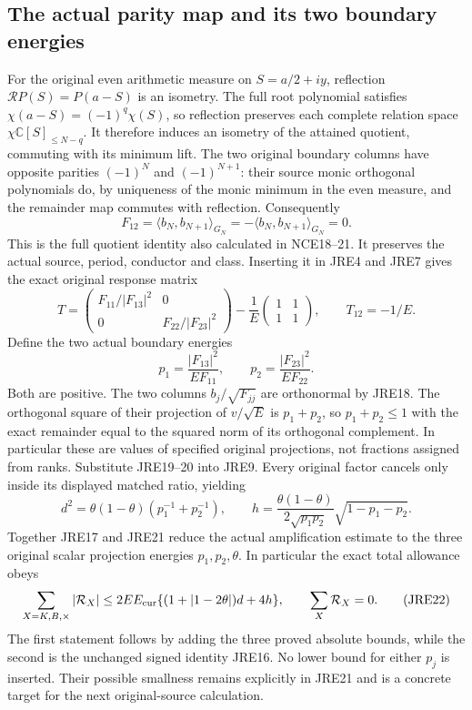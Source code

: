 \documentclass[11pt,a4paper]{article}
\begin{document}
\subsection{The actual parity map and its two boundary energies}
For the original even arithmetic measure on $S=a/2+iy$, reflection
$\mathcal R P(S)=P(a-S)$ is an isometry. The full root polynomial
satisfies $\chi(a-S)=(-1)^q\chi(S)$, so reflection preserves each
complete relation space $\chi\mathbb C[S]_{\le N-q}$. It therefore
induces an isometry of the attained quotient, commuting with its
minimum lift. The two original boundary columns have opposite
parities $(-1)^N$ and $(-1)^{N+1}$: their source monic orthogonal
polynomials do, by uniqueness of the monic minimum in the even
measure, and the remainder map commutes with reflection. Consequently
\[
 F_{12}=\langle b_N,b_{N+1}\rangle_{G_N}
       =-\langle b_N,b_{N+1}\rangle_{G_N}=0 .                   \tag{JRE18}
\]
This is the full quotient identity also calculated in NCE18--21.
It preserves the actual source, period, conductor and class. Inserting
it in JRE4 and JRE7 gives the exact original response matrix
\[
 T=\begin{pmatrix}F_{11}/|F_{13}|^2&0\\0&F_{22}/|F_{23}|^2\end{pmatrix}
       -\frac1E\begin{pmatrix}1&1\\1&1\end{pmatrix},\qquad
 T_{12}=-1/E .                                                \tag{JRE19}
\]
Define the two actual boundary energies
\[
 p_1=\frac{|F_{13}|^2}{EF_{11}},\qquad
 p_2=\frac{|F_{23}|^2}{EF_{22}}.                              \tag{JRE20}
\]
Both are positive. The two columns $b_j/\sqrt{F_{jj}}$ are
orthonormal by JRE18. The orthogonal square of their projection
of $v/\sqrt E$ is $p_1+p_2$, so $p_1+p_2\le1$ with the exact
remainder equal to the squared norm of its orthogonal complement.
In particular these are values of specified original projections,
not fractions assigned from ranks.
Substitute JRE19--20 into JRE9. Every original factor cancels
only inside its displayed matched ratio, yielding
\[
 \boxed{d^2=\theta(1-\theta)(p_1^{-1}+p_2^{-1}),\qquad
 h=\frac{\theta(1-\theta)}{2\sqrt{p_1p_2}}
                    \sqrt{1-p_1-p_2}.}                       \tag{JRE21}
\]
Together JRE17 and JRE21 reduce the actual amplification estimate
to the three original scalar projection energies
$p_1,p_2,\theta$. In particular the exact total allowance obeys
\[
 \sum_{X=K,B,\times}|\mathcal R_X|
 \le2EE_{\rm cur}\{(1+|1-2\theta|)d+4h\},\qquad
 \sum_X\mathcal R_X=0.                                      \tag{JRE22}
\]
The first statement follows by adding the three proved absolute
bounds, while the second is the unchanged signed identity JRE16.
No lower bound for either $p_j$ is inserted. Their possible smallness
remains explicitly in JRE21 and is a concrete target for the next
original-source calculation.
\end{document}
